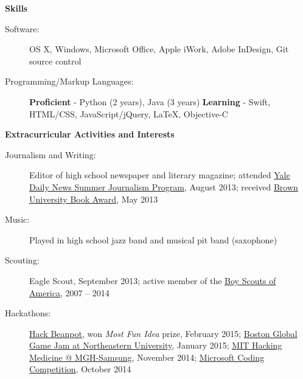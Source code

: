 \documentclass[letterpaper,10pt]{article}
\newcommand{\resheading}[1]{{\large \colorbox{mygrey}{\begin{minipage}{\textwidth}{\textbf{#1 \vphantom{p\^{E}}}}\end{minipage}}}}
\begin{document}
\resheading{Skills}
	\begin{description}
		\item[Software:] {\footnotesize OS X, Windows, Microsoft Office, Apple iWork, Adobe InDesign, Git source control}
		\item[Programming/Markup Languages:] {\footnotesize \textbf{Proficient} - Python (2 years), Java (3 years) \enspace \textbf{Learning} - Swift, HTML/CSS, JavaScript/jQuery, \LaTeX, Objective-C}
	
	\end{description}

\resheading{Extracurricular Activities and Interests}
	\begin{description}
		\item[Journalism and Writing:] { \footnotesize Editor of high school newspaper and literary magazine; attended \href{http://yaledailynews.com/about-us/sjp/}{Yale Daily News Summer Journalism Program}, August 2013; received \href{http://www.brown.edu/campus-life/support/bookstore/book-award}{Brown University Book Award}, May 2013}
		\item[Music:] { \footnotesize Played in high school jazz band and musical pit band (saxophone)}
		\item[Scouting:] {\footnotesize Eagle Scout, September 2013; active member of the \href{http://www.scouting.org}{Boy Scouts of America}, 2007 -- 2014}
		\item[Hackathons:] {\footnotesize \href{http://hackbeanpot.com}{Hack Beanpot}, won \emph{Most Fun Idea} prize, February 2015; \href{http://globalgamejam.org/2014/jam-sites/boston-ggj-northeastern-university}{Boston Global Game Jam at Northeastern University}, January 2015; \href{http://hackingmedicine.mit.edu/upcoming-events/mgh-samsung/}{MIT Hacking Medicine @ MGH-Samsung}, November 2014; \href{http://www.northeastern.edu/careers/employers/microsoft-coding-competition/}{Microsoft Coding Competition}, October 2014}
		
	\end{description} %
	
\end{document}
